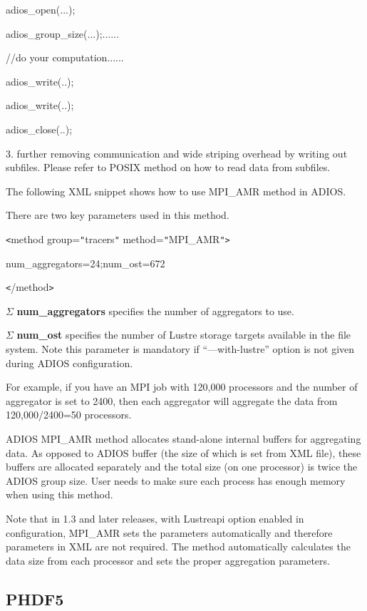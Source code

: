 \leftskip=36pt
adios\_open(...);

adios\_group\_size(...);......

//do your computation......

adios\_write(..);

adios\_write(..);

adios\_close(..);

\leftskip=0pt
3. further removing communication and wide striping overhead by writing out subfiles. 
Please refer to POSIX method on how to read data from subfiles.

The following XML snippet shows how to use MPI\_AMR method in ADIOS.

There are two key parameters used in this method.

\texttt{<}method group=\texttt{"}tracers\texttt{"} method=\texttt{"}MPI\_AMR\texttt{"}\texttt{>}

\parindent=18pt
num\_aggregators=24;num\_ost=672

\parindent=0pt
\texttt{<}/method\texttt{>}

\ensuremath{\Sigma} \textbf{num\_aggregators} specifies the number of aggregators 
to use.

\ensuremath{\Sigma} \textbf{num\_ost }specifies the number of Lustre storage targets 
 available in the file system. Note this parameter is mandatory if ``---with-lustre'' 
option is not given during ADIOS configuration.

For example, if you have an MPI job with 120,000 processors and the number of aggregator 
is set to 2400, then each aggregator will aggregate the data from 120,000/2400=50 
processors.

ADIOS MPI\_AMR method allocates stand-alone internal buffers for aggregating data. 
As opposed to ADIOS buffer (the size of which is set from XML file), these buffers 
are allocated separately and the total size (on one processor) is twice the ADIOS 
group size. User needs to make sure each process has enough memory when using this 
method.  

Note that in 1.3 and later releases, with Lustreapi option enabled in configuration, 
MPI\_AMR sets the parameters automatically and therefore parameters in XML are 
not required. The method automatically calculates the data size from each processor 
and sets the proper aggregation parameters.\label{HToc84890261}\label{HToc212016637}\label{HToc212016879}\label{HToc182553386}

\subsection{PHDF5}

